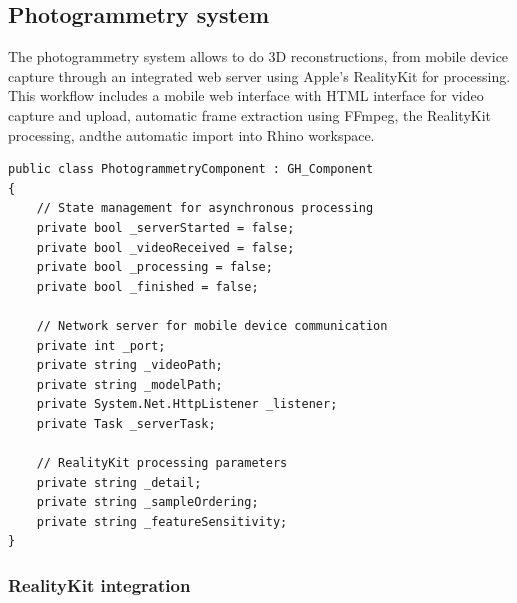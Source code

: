 \subsection{Photogrammetry system}

The photogrammetry system allows to do 3D reconstructions, from mobile device capture through an integrated web server using Apple's RealityKit for processing. This workflow includes a mobile web interface with HTML interface for video capture and upload, automatic frame extraction using FFmpeg, the RealityKit processing, andthe automatic import into Rhino workspace.

\vspace{0.5cm}

\begin{verbatim}
public class PhotogrammetryComponent : GH_Component
{
    // State management for asynchronous processing
    private bool _serverStarted = false;
    private bool _videoReceived = false;
    private bool _processing = false;
    private bool _finished = false;
    
    // Network server for mobile device communication
    private int _port;
    private string _videoPath;
    private string _modelPath;
    private System.Net.HttpListener _listener;
    private Task _serverTask;
    
    // RealityKit processing parameters
    private string _detail;
    private string _sampleOrdering;
    private string _featureSensitivity;
}
\end{verbatim}

\subsubsection{RealityKit integration}

